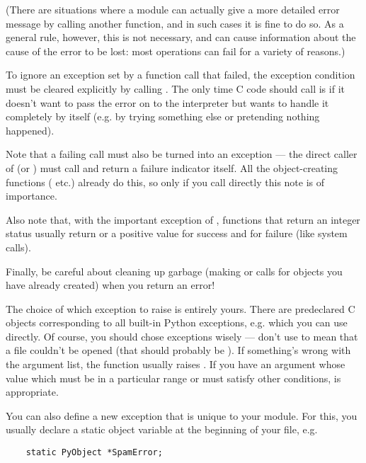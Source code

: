 (There are situations where a module can actually give a more detailed
error message by calling another  function, and in such
cases it is fine to do so.  As a general rule, however, this is not
necessary, and can cause information about the cause of the error to
be lost: most operations can fail for a variety of reasons.)

To ignore an exception set by a function call that failed, the exception
condition must be cleared explicitly by calling . 
The only time C code should call  is if it doesn't
want to pass the error on to the interpreter but wants to handle it
completely by itself (e.g. by trying something else or pretending
nothing happened).

Note that a failing  call must also be turned into an
exception --- the direct caller of  (or
) must call  and return a
failure indicator itself.  All the object-creating functions
( etc.) already do this, so only if you call
 directly this note is of importance.

Also note that, with the important exception of
, functions that return an integer status
usually return  or a positive value for success and 
for failure (like \UNIX{} system calls).

Finally, be careful about cleaning up garbage (making 
or  calls for objects you have already created) when
you return an error!

The choice of which exception to raise is entirely yours.  There are
predeclared C objects corresponding to all built-in Python exceptions,
e.g.  which you can use directly.  Of
course, you should chose exceptions wisely --- don't use
 to mean that a file couldn't be opened (that
should probably be ).  If something's wrong with
the argument list, the  function usually
raises .  If you have an argument whose value
which must be in a particular range or must satisfy other conditions,
 is appropriate.

You can also define a new exception that is unique to your module.
For this, you usually declare a static object variable at the
beginning of your file, e.g.

\begin{verbatim}
    static PyObject *SpamError;
\end{verbatim}

